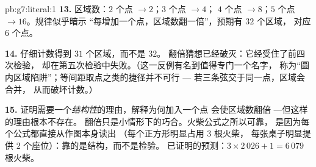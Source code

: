 \begin{solution}{pb:g7:literal:1}
\textbf{13.} 区域数：$2$ 个点 $\to 2$；$3$ 个点 $\to 4$；
$4$ 个点 $\to 8$；$5$ 个点 $\to 16$。规律似乎暗示
“每增加一个点，区域数翻一倍”，预期有 $32$ 个区域，
对应 $6$ 个点。

\textbf{14.} 仔细计数得到 $31$ 个区域，而不是 $32$。
翻倍猜想已经破灭：它经受住了前四次检验，
却在第五次检验中失败。（这一反例有名到值得专门一个名字，
称为“圆内区域陷阱”；等间距取点之类的捷径并不可行 ---
若三条弦交于同一点，区域会合并，
从而破坏计数。）

\textbf{15.} 证明需要一个\emph{结构性}的理由，解释为何加入一个点
会使区域数翻倍 ---但这样的理由根本不存在。
翻倍只是小情形下的巧合。火柴公式之所以可靠，
是因为每个公式都直接从作图本身读出
（每个正方形明显占用 $3$ 根火柴，
每张桌子明显提供 $2$ 个座位）：靠的是结构，而不是检验。
已证明的预测：$3 \times 2\,026 + 1 = 6\,079$ 根火柴。
\end{solution}
